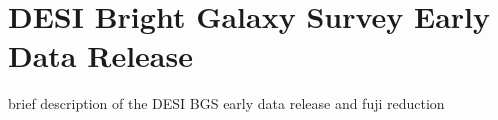 \section{DESI Bright Galaxy Survey Early Data Release}  \label{sec:edr}
brief description of the DESI BGS early data release and fuji reduction 
